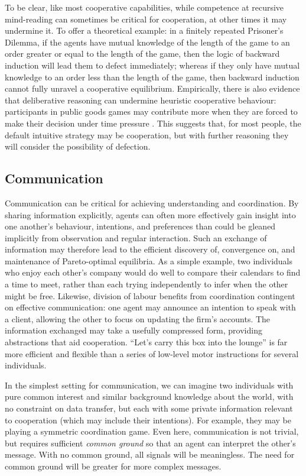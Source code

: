 \documentclass[11pt, a4paper, logo, onecolumn, nonumbering]{deepmind}
\begin{document}
To be clear, like most cooperative capabilities, while competence at recursive mind-reading can sometimes be critical for cooperation, at other times it may undermine it. To offer a theoretical example: in a finitely repeated Prisoner's Dilemma, if the agents have mutual knowledge of the length of the game to an order greater or equal to the length of the game, then the logic of backward induction will lead them to defect immediately; whereas if they only have mutual knowledge to an order less than the length of the game, then backward induction cannot fully unravel a cooperative equilibrium. Empirically, there is also evidence that deliberative reasoning can undermine heuristic cooperative behaviour: 
participants in public goods games may contribute more when they are forced to make their decision under time pressure \cite{rand2012spontaneous, rand2014social}. This suggests that, for most people, the default intuitive strategy may be cooperation, but with further reasoning they will consider the possibility of defection. 



\subsection{Communication}  
\label{section:communication}

Communication can be critical for achieving understanding and coordination. By sharing information explicitly, agents can often more effectively gain insight into one another's behaviour, intentions,
and preferences than could be gleaned implicitly from observation and regular interaction. Such an exchange of information may therefore lead to the efficient discovery of, convergence on, and maintenance of Pareto-optimal equilibria. As a simple example, two individuals who enjoy each other's company would do well to compare their calendars to find a time to meet, rather than each trying independently to infer when the other might be free. Likewise, division of labour benefits from coordination contingent on effective communication:  one agent may announce an intention to speak with a client, allowing the other to focus on updating the firm's accounts. The information exchanged may take a usefully compressed form, providing abstractions that aid cooperation. ``Let's carry this box into the lounge'' is far more efficient and flexible than a series of low-level motor instructions for several individuals.

In the simplest setting for communication, we can imagine two individuals with pure common interest and similar background knowledge about the world, with no constraint on data transfer, but each with some private information relevant to cooperation (which may include their intentions). For example, they may be playing a symmetric coordination game. 
Even here, communication is not trivial, but requires sufficient \textit{common ground} \cite{Clark1991-CLAGIC} so that an agent can interpret the other's message. With no common ground, all signals will be meaningless. 
The need for common ground will be greater for more complex messages.  
\end{document}
